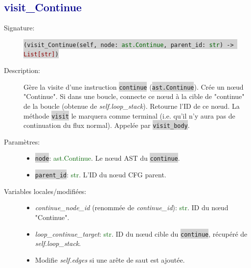 \documentclass[11pt,a4paper]{article}
\newcommand{\code}[1]{\colorbox{lightgray}{\texttt{\small #1}}}
\newcommand{\var}[1]{\textit{#1}}
\newcommand{\vartype}[1]{\textcolor{darkgreen}{#1}}
\newcommand{\methodname}[1]{\textbf{\textcolor{darkblue}{#1}}}
\newcommand{\param}[1]{\code{#1}}
\newcommand{\rettype}[1]{\textcolor{darkred}{#1}}
\begin{document}
\subsection*{\methodname{visit\_Continue}}
\begin{description}
    \item[Signature:] \code{(visit\_Continue(self, node: \vartype{ast.Continue}, parent\_id: \vartype{str}) -> \rettype{List[str]})}
    \item[Description:] Gère la visite d'une instruction \code{continue} (\code{ast.Continue}). Crée un nœud "Continue". Si dans une boucle, connecte ce nœud à la cible de "continue" de la boucle (obtenue de \var{self.loop\_stack}). Retourne l'ID de ce nœud. La méthode \code{visit} le marquera comme terminal (i.e. qu'il n'y aura pas de continuation du flux normal). Appelée par \code{visit\_body}.
    \item[Paramètres:]
    \begin{itemize}
        \item \param{node}: \vartype{ast.Continue}. Le nœud AST du \code{continue}.
        \item \param{parent\_id}: \vartype{str}. L'ID du nœud CFG parent.
    \end{itemize}
    \item[Variables locales/modifiées:]
    \begin{itemize}
        \item \var{continue\_node\_id} (renommée de \var{continue\_id}): \vartype{str}. ID du nœud "Continue".
        \item \var{loop\_continue\_target}: \vartype{str}. ID du nœud cible du \code{continue}, récupéré de \var{self.loop\_stack}.
        \item Modifie \var{self.edges} si une arête de saut est ajoutée.
    \end{itemize}
\end{description}
\end{document}
